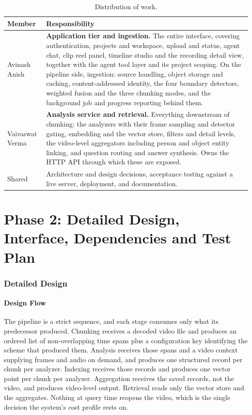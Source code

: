 \documentclass[11pt,a4paper]{article}
\begin{document}
\begin{table}[htbp]
\centering
\small
\begin{tabularx}{\textwidth}{@{}L{3.8cm}X@{}}
\toprule
\textbf{Member} & \textbf{Responsibility} \\
\midrule
Avinash Anish &
\textbf{Application tier and ingestion.} The entire interface, covering
authentication, projects and workspace, upload and status, agent chat, clip reel
panel, timeline studio and the recording detail view, together with the agent
tool layer and its project scoping. On the pipeline side, ingestion: source
handling, object storage and caching, content-addressed identity, the four
boundary detectors, weighted fusion and the three chunking modes, and the
background job and progress reporting behind them. \\
Vaivaswat Verma &
\textbf{Analysis service and retrieval.} Everything downstream of chunking: the
analyzers with their frame sampling and detector gating, embedding and the
vector store, filters and detail levels, the video-level aggregators including
person and object entity linking, and question routing and answer synthesis.
Owns the HTTP API through which these are exposed. \\
\midrule
Shared & Architecture and design decisions, acceptance testing against a live
server, deployment, and documentation. \\
\bottomrule
\end{tabularx}
\caption{Distribution of work.}
\end{table}

\part{Phase 2: Detailed Design, Interface, Dependencies and Test Plan}

\section{Detailed Design}

\subsection{Design Flow}

The pipeline is a strict sequence, and each stage consumes only what its
predecessor produced. Chunking receives a decoded video file and produces an
ordered list of non-overlapping time spans plus a configuration key identifying
the scheme that produced them. Analysis receives those spans and a video context
supplying frames and audio on demand, and produces one structured record per
chunk per analyzer. Indexing receives those records and produces one vector
point per chunk per analyzer. Aggregation receives the saved records, not the
video, and produces video-level output. Retrieval reads only the vector store
and the aggregates. Nothing at query time reopens the video, which is the single
decision the system's cost profile rests on.
\end{document}
